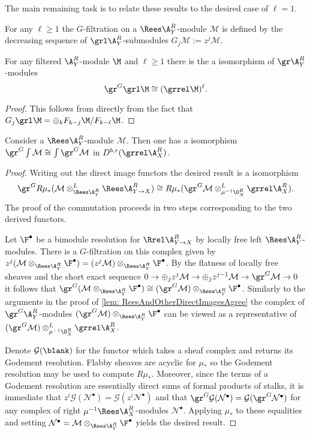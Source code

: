 The main remaining task is to relate these results to the desired case of $\ell = 1$.
\begin{definition}
For any $\ell \geq 1$ the $G$-filtration on a $\Rees\A_Y^R$-module $\mathcal{M}$ is defined by the decreasing sequence of $\grl\A_Y^R$-submodules $G_j \mathcal{M} := z^{j}\mathcal{M}$.
\end{definition}
\begin{lemma}\label{lem: GradedGGradedLYieldsGraded}
For any filtered $\A_Y^R$-module $\M$ and $\ell \geq 1$ there is the a isomorphism of $\gr \A_Y^R$-modules
$$\gr^G \grl \M \cong (\grrel\M)^\ell.$$
\end{lemma}
\begin{proof}
This follows from directly from the fact that $G_j\grl\M = \oplus_k F_{k-j}\M /F_{k-\ell}\M$.
\end{proof}
\begin{lemma}\label{lem: grGCommutes}
Consider a $\Rees\A_Y^R$-module $\mathcal{M}$. Then one has a isomorphism $\gr^G\int\mathcal{M} \cong \int\gr^G\mathcal{M}$ in $D^{b,r}(\grrel\A_X^R)$.
\end{lemma}
\begin{proof}
Writing out the direct image functors the desired result is a isomorphism $$\gr^GR\mu_*(\mathcal{M}\otimes^L_{\Rees\A_Y^R} \Rees\A_{Y\to X}^R)  \cong R\mu_*(\gr^G\mathcal{M}\otimes^L_{\mu^{-1}\O_X^R}\grrel\A_X^R).$$
The proof of the commutation proceeds in two steps corresponding to the two derived functors.

Let $\F^\bullet$ be a bimodule resolution for $\Rrel\A_{Y\to X}^R$ by locally free left $\Rees \A_Y^R$-modules.
There is a $G$-filtration on this complex given by $z^j(\mathcal{M}\otimes_{\Rees\A_Y^R} \F^\bullet) = (z^j\mathcal{M})\otimes_{\Rees\A_Y^R} \F^\bullet$.
By the flatness of locally free sheaves and the short exact sequence $0\to \oplus_j z^j \mathcal{M} \to \oplus_j z^{j-1}\mathcal{M} \to \gr^G \mathcal{M} \to 0$ it follows that $\gr^G(\mathcal{M}\otimes_{\Rees\A_Y^R} \F^\bullet) \cong (\gr^G\mathcal{M})\otimes_{\Rees\A_Y^R} \F^\bullet$.
Similarly to the arguments in the proof of \cref{lem: ReesAndOtherDirectImagesAgree} the complex of $\gr^G\A_Y^R$-modules  $(\gr^G\mathcal{M})\otimes_{\Rees\A_Y^R} \F^\bullet$ can be viewed as a representative of $(\gr^G\mathcal{M})\otimes^L_{\mu^{-1}\O_X^R}\grrel\A_X^R$.

Denote $\mathcal{G}(\blank)$ for the functor which takes a sheaf complex and returns its Godement resolution.
Flabby sheaves are acyclic for $\mu_*$ so the Godement resolution may be used to compute $R\mu_*$.
Moreover, since the terms of a Godement resolution are essentially direct sums of formal products of stalks, it is immediate that $z^i \mathcal{G}(\mathcal{N}^\bullet) = \mathcal{G}(z^i\mathcal{N}^\bullet)$ and that $\gr^G\mathcal{G}(\mathcal{N}^\bullet) =\mathcal{G}(\gr^G\mathcal{N}^\bullet)$ for any complex of right $\mu^{-1}\Rees\A_X^R$-modules $\mathcal{N}^\bullet$.
Applying $\mu_*$ to these equalities and setting $\mathcal{N}^\bullet = \mathcal{M}\otimes_{\Rees\A_Y^R} \F^\bullet$ yields the desired result.
\end{proof}
